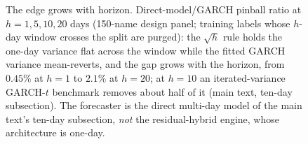 \documentclass[11pt]{article}
\begin{document}
\clearpage
\begin{figure}[htbp]
\centering
{}
\caption{The edge grows with horizon. Direct-model/GARCH pinball
ratio at $h = 1, 5, 10, 20$ days (150-name design panel; training
labels whose $h$-day window crosses the split are purged): the
$\sqrt{h}$ rule holds the one-day variance flat across the window while
the fitted GARCH variance mean-reverts, and the gap grows with the
horizon, from $0.45\%$ at $h{=}1$ to $2.1\%$ at $h{=}20$; at $h{=}10$ an
iterated-variance GARCH-$t$ benchmark removes about half of it (main text,
ten-day subsection). The forecaster is the
direct multi-day model of the main text's ten-day subsection,
\emph{not} the residual-hybrid engine, whose architecture is
one-day.}
\label{fig:horizon}
\end{figure}
\clearpage
\end{document}
